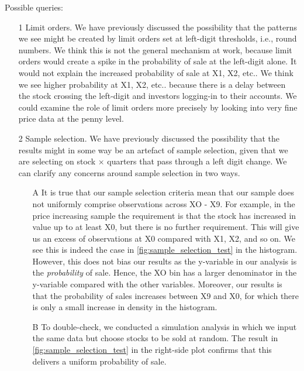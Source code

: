 Possible queries:
\begin{itemize}
	\item [1] Limit orders. We have previously discussed the possibility that the patterns we see might be created by limit orders set at left-digit thresholds, i.e., round numbers. We think this is not the general mechanism at work, because limit orders would create a spike in the probability of sale at the left-digit alone. It would not explain the increased probability of sale at X1, X2, etc.. We think we see higher probability at X1, X2, etc.. because there is a delay between the stock crossing the left-digit and investors logging-in to their accounts. We could examine the role of limit orders more precisely by looking into very fine price data at the penny level.
	\item [2] Sample selection. We have previously discussed the possibility that the results might in some way be an artefact of sample selection, given that we are selecting on stock $\times$ quarters that pass through a left digit change. We can clarify any concerns around sample selection in two ways. 
	\begin{itemize}
		\item [A] It is true that our sample selection criteria mean that our sample does not uniformly comprise observations across XO - X9. For example, in the price increasing sample the requirement is that the stock has increased in value up to at least X0, but there is no further requirement. This will give us an excess of observations at X0 compared with X1, X2, and so on. We see this is indeed the case in \ref{fig:sample_selection_test} in the histogram. However, this does not bias our results as the y-variable in our analysis is the \textit{probability} of sale. Hence, the XO bin has a larger denominator in the y-variable compared with the other variables. Moreover, our results is that the probability of sales increases between X9 and X0, for which there is only a small increase in density in the histogram.
		\item [B] To double-check, we conducted a simulation analysis in which we input the same data but choose stocks to be sold at random. The result in \ref{fig:sample_selection_test} in the right-side plot confirms that this delivers a uniform probability of sale. 
	\end{itemize}
\end{itemize}

\clearpage

